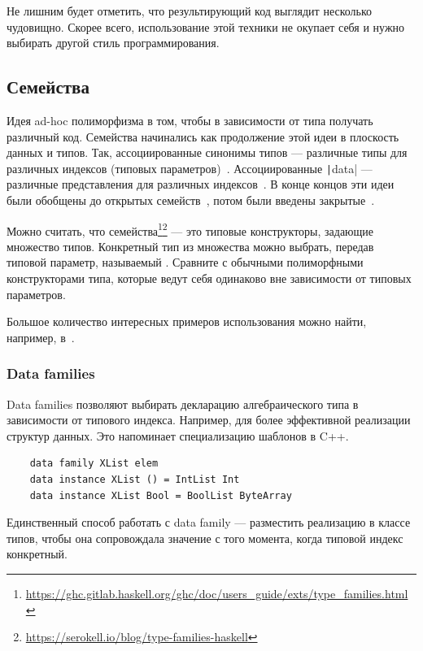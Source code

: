 Не лишним будет отметить, что результирующий код выглядит несколько чудовищно.
Скорее всего, использование этой техники не окупает себя и нужно выбирать другой стиль программирования.

\subsection{Семейства} \label{subsec:families}

Идея ad-hoc полиморфизма в том, чтобы в зависимости от типа получать различный код.
Семейства начинались как продолжение этой идеи в плоскость данных и типов.
Так, ассоциированные синонимы типов --- различные типы для различных индексов (типовых параметров)~\cite{chakravarty2005associated-syn}.
Ассоциированные \texttt|data| --- различные представления для различных индексов~\cite{chakravarty2005associated}.
В конце концов эти идеи были обобщены до открытых семейств~\cite{schrijvers2008type}, потом были введены закрытые~\cite{eisenberg2014closed}.

Можно считать, что семейства\footnote{\url{https://ghc.gitlab.haskell.org/ghc/doc/users_guide/exts/type_families.html}}\footnote{\url{https://serokell.io/blog/type-families-haskell}} --- это типовые конструкторы, задающие множество типов.
Конкретный тип из множества можно выбрать, передав типовой параметр, называемый .
Сравните с обычными полиморфными конструкторами типа, которые ведут себя одинаково вне зависимости от типовых параметров.

Большое количество интересных примеров использования можно найти, например, в~\cite{kiselyov2010fun}.

\subsubsection{Data families}

Data families позволяют выбирать декларацию алгебраического типа в зависимости от типового индекса.
Например, для более эффективной реализации структур данных.
Это напоминает специализацию шаблонов в C++.

\begin{verbatim}
    data family XList elem
    data instance XList () = IntList Int
    data instance XList Bool = BoolList ByteArray
\end{verbatim}

Единственный способ работать с data family --- разместить реализацию в классе типов, чтобы она сопровождала значение с того момента, когда типовой индекс конкретный.

